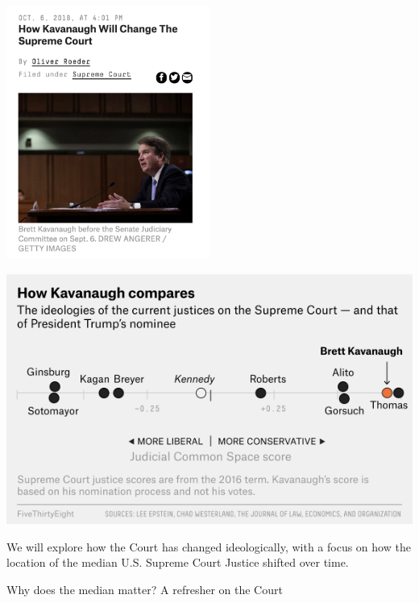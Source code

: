 \documentclass[
  letterpaper,
  DIV=11,
  numbers=noendperiod]{scrreprt}
\begin{document}
\includegraphics[width=0.5\textwidth,height=\textheight]{images/kav.png}

\includegraphics{images/kavcourt.png}

We will explore how the Court has changed ideologically, with a focus on
how the location of the median U.S. Supreme Court Justice shifted over
time.

Why does the median matter? A refresher on the Court
\end{document}
